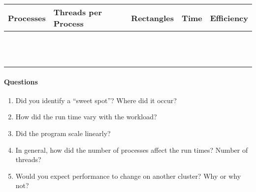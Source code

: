 \begin{table}[H]
\centering
\label{worksheetTable}
\begin{tabu} to \textwidth { | X[cm] | X[cm] | X[cm] | X[cm] | X[cm] | }
\hline
\textbf{Processes} & \textbf{Threads per Process} & \textbf{Rectangles} & \textbf{Time} & \textbf{Efficiency} \\ \hline
                   &                              &                     &               &                     \\ \hline
                   &                              &                     &               &                     \\ \hline
                   &                              &                     &               &                     \\ \hline
                   &                              &                     &               &                     \\ \hline
                   &                              &                     &               &                     \\ \hline
                   &                              &                     &               &                     \\ \hline
                   &                              &                     &               &                     \\ \hline
                   &                              &                     &               &                     \\ \hline
                   &                              &                     &               &                     \\ \hline
                   &                              &                     &               &                     \\ \hline
                   &                              &                     &               &                     \\ \hline
                   &                              &                     &               &                     \\ \hline
\end{tabu}
\end{table}

\bigskip
\paragraph{Questions}
\begin{enumerate}
\setlength\itemsep{8em}
\item Did you identify a ``sweet spot''? Where did it occur?
\item How did the run time vary with the workload?
\item Did the program scale linearly?
\item In general, how did the number of processes affect the run times? Number of threads?
\item Would you expect performance to change on another cluster? Why or why not?
\end{enumerate}
